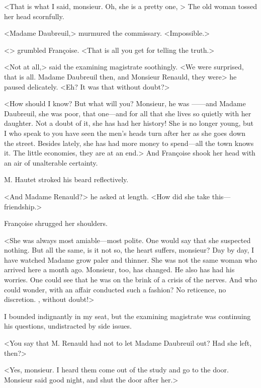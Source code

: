  <That is what I said, monsieur. Oh, she is a pretty one, > The old woman tossed her head scornfully. 
 
 

 <Madame Daubreuil,> murmured the commissary. <Impossible.> 

 <> grumbled Françoise. <That is all you get for telling the truth.> 

 <Not at all,> said the examining magistrate soothingly. <We were surprised, that is all. Madame Daubreuil then, and Monsieur Renauld, they were\longdash> he paused delicately. <Eh? It was that without doubt?> 

 <How should I know? But what will you? Monsieur, he was ——and Madame Daubreuil, she was poor, that one—and  for all that she lives so quietly with her daughter. Not a doubt of it, she has had her history! She is no longer young, but  I who speak to you have seen the men's heads turn after her as she goes down the street. Besides lately, she has had more money to spend—all the town knows it. The little economies, they are at an end.> And Françoise shook her head with an air of unalterable certainty. 

 M. Hautet stroked his beard reflectively. 

 <And Madame Renauld?> he asked at length. <How did she take this—friendship.> 

 Françoise shrugged her shoulders. 

 <She was always most amiable—most polite. One would say that she suspected nothing. But all the same, is it not so, the heart suffers, monsieur? Day by day, I have watched Madame grow paler and thinner. She was not the same woman who arrived here a month ago. Monsieur, too, has changed. He also has had his worries. One could see that he was on the brink of a crisis of the nerves. And who could wonder, with an affair conducted such a fashion? No reticence, no discretion. , without doubt!> 

 I bounded indignantly in my seat, but the examining magistrate was continuing his questions, undistracted by side issues. 

 <You say that M. Renauld had not to let Madame Daubreuil out? Had she left, then?> 

 <Yes, monsieur. I heard them come out of the study and go to the door. Monsieur said good night, and shut the door after her.> 

